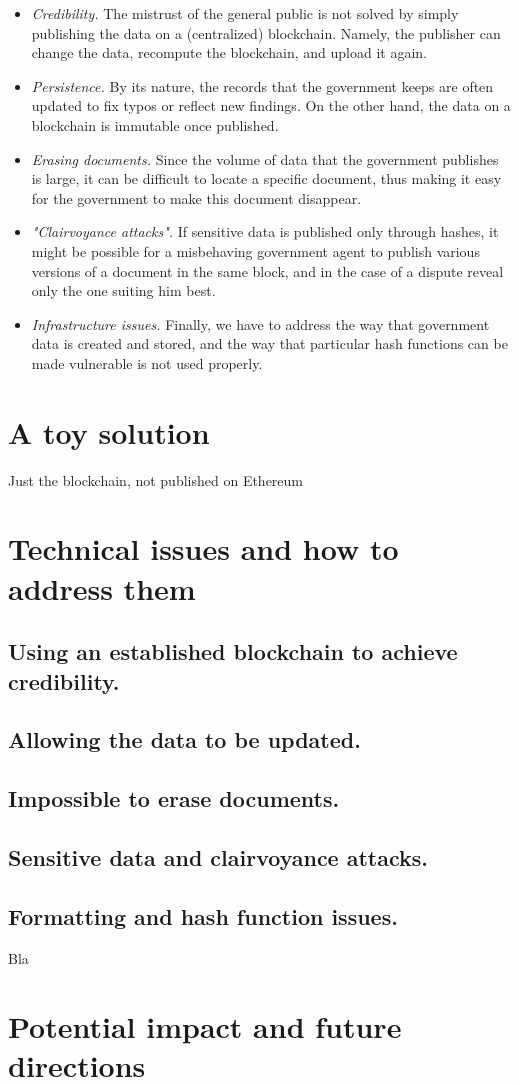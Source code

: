 \documentclass[conference]{IEEEtran}
\begin{document}
\begin{itemize}
\item {\it Credibility.} The mistrust of the general public is not solved by simply publishing the data on a (centralized) blockchain. Namely, the publisher can change the data, recompute the blockchain, and upload it again.
\item {\it Persistence.} By its nature, the records that the government keeps are often updated to fix typos or reflect new findings. On the other hand, the data on a blockchain is immutable once published.
\item {\it Erasing documents.} Since the volume of data that the government publishes is large, it can be difficult to locate a specific document, thus making it easy for the government to make this document disappear.
\item {\it "Clairvoyance attacks".} If sensitive data is published only through hashes, it might be possible for a misbehaving government agent to publish various versions of a document in the same block, and in the case of a dispute reveal only the one suiting him best.
\item {\it Infrastructure issues.} Finally, we have to address the way that government data is created and stored, and the way that particular hash functions can be made vulnerable is not used properly. 
\end{itemize}

\section{A toy solution}
Just the blockchain, not published on Ethereum

\section{Technical issues and how to address them}

\subsection{Using an established blockchain to achieve credibility.}

\subsection{Allowing the data to be updated.}

\subsection{Impossible to erase documents.}

\subsection{Sensitive data and clairvoyance attacks.}

\subsection{Formatting and hash function issues.}

Bla

\section{Potential impact and future directions}
\end{document}
